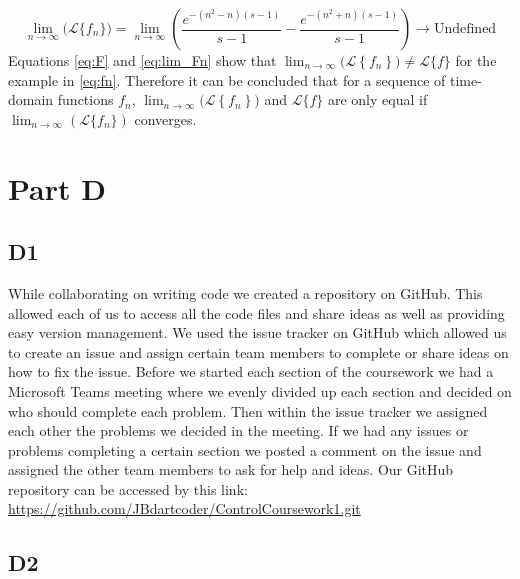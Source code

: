 \documentclass[a4paper,10pt,reqno]{amsart}
\numberwithin{equation}{section}
\newcommand{\lap}{\mathscr{L}}
\begin{document}
\begin{equation}\label{eq:lim_Fn}
     \lim_{n \to \infty} \big(\lap\{f_n\}\big) = \lim_{n \to \infty} \left(\frac{e^{-(n^2 - n)(s-1)}}{s-1} - \frac{e^{-(n^2 + n)(s-1)}}{s-1}\right) \to \text{Undefined}
\end{equation}
\vspace{1pt}
Equations \eqref{eq:F} and \eqref{eq:lim_Fn} show that $\lim_{n \to \infty} \big(\lap\left\{f_n\right\}\big) \neq \lap\{f\}$ for the example in \eqref{eq:fn}. Therefore it can be concluded that for a sequence of time-domain functions $f_n$, $\lim_{n \to \infty} \big(\lap\left\{f_n\right\}\big)$ and $\lap\{f\}$ are only equal if $\lim_{n \to \infty} (\lap\{f_n\})$ converges.


\section{Part D}

\subsection{D1}\label{sec:d1}

While collaborating on writing code we created a repository on GitHub. This allowed each of us to access all the code files and share ideas as well as providing easy version management. We used the issue tracker on GitHub which allowed us to create an issue and assign certain team members to complete or share ideas on how to fix the issue. Before we started each section of the coursework we had a Microsoft Teams meeting where we evenly divided up each section and decided on who should complete each problem. Then within the issue tracker we assigned each other the problems we decided in the meeting. If we had any issues or problems completing a certain section we posted a comment on the issue and assigned the other team members to ask for help and ideas. Our GitHub repository can be accessed by this link: \url{https://github.com/JBdartcoder/ControlCoursework1.git}


\subsection{D2}\label{sec:d2}
\end{document}
